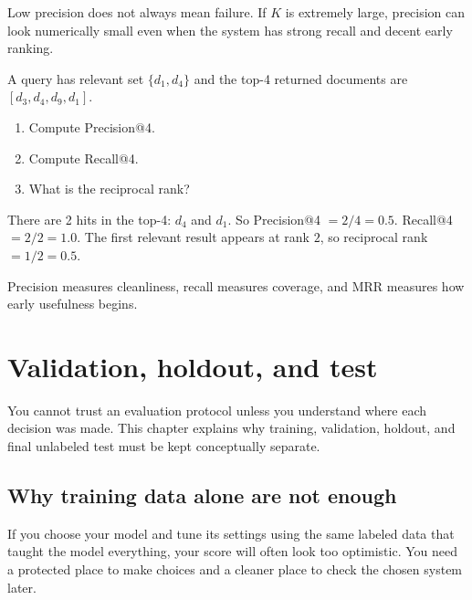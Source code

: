 \documentclass[11pt,oneside]{report}
\begin{document}
\begin{warningbox}
Low precision does not always mean failure. If $K$ is extremely large, precision can look numerically small even when the system has strong recall and decent early ranking.
\end{warningbox}

\begin{selfcheckbox}
A query has relevant set $\{d_1,d_4\}$ and the top-4 returned documents are $[d_3,d_4,d_9,d_1]$.
\begin{enumerate}
\item Compute Precision@4.
\item Compute Recall@4.
\item What is the reciprocal rank?
\end{enumerate}
\end{selfcheckbox}

\begin{answerbox}
There are 2 hits in the top-4: $d_4$ and $d_1$. So Precision@4 $=2/4=0.5$. Recall@4 $=2/2=1.0$. The first relevant result appears at rank $2$, so reciprocal rank $=1/2=0.5$.
\end{answerbox}

\begin{rememberbox}
Precision measures cleanliness, recall measures coverage, and MRR measures how early usefulness begins.
\end{rememberbox}


\chapter[Validation, Holdout, and Test]{Validation, holdout, and test}

\begin{purposebox}
You cannot trust an evaluation protocol unless you understand where each decision was made. This chapter explains why training, validation, holdout, and final unlabeled test must be kept conceptually separate.
\end{purposebox}

\section*{Why training data alone are not enough}
If you choose your model and tune its settings using the same labeled data that taught the model everything, your score will often look too optimistic. You need a protected place to make choices and a cleaner place to check the chosen system later.
\end{document}
